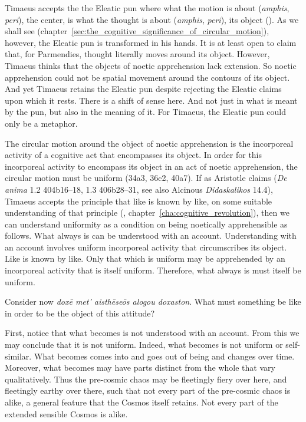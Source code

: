 Timaeus accepts the the Eleatic pun where what the motion is about (\emph{amphis}, \emph{peri}), the center, is what the thought is about (\emph{amphis}, \emph{peri}), its object (\citealt[191--3]{Mourelatos:2008ve}). As we shall see (chapter~\ref{sec:the_cognitive_significance_of_circular_motion}), however, the Eleatic pun is transformed in his hands. It is at least open to claim that, for Parmendies, thought literally moves around its object. However, Timaeus thinks that the objects of noetic apprehension lack extension. So noetic apprehension could not be spatial movement around the contours of its object. And yet Timaeus retains the Eleatic pun despite rejecting the Eleatic claims upon which it rests. There is a shift of sense here. And not just in what is meant by the pun, but also in the meaning of it. For Timaeus, the Eleatic pun could only be a metaphor.

The circular motion around the object of noetic apprehension is the incorporeal activity of a cognitive act that encompasses its object. In order for this incorporeal activity to encompass its object in an act of noetic apprehension, the circular motion must be uniform (34a3, 36c2, 40a7). If as Aristotle claims (\emph{De anima} 1.2 404b16--18, 1.3 406b28--31, see also Alcinous \emph{Didaskalikos} 14.4), Timaeus accepts the principle that like is known by like, on some suitable understanding of that principle (\citealt{Corcilius:2018bd}, chapter~\ref{cha:cognitive_revolution}), then we can understand uniformity as a condition on being noetically apprehensible as follows. What always is can be understood with an account. Understanding with an account involves uniform incorporeal activity that circumscribes its object. Like is known by like. Only that which is uniform may be apprehended by an incorporeal activity that is itself uniform. Therefore, what always is must itself be uniform.

Consider now \emph{doxē met’ aisthēseōs alogou doxaston}. What must something be like in order to be the object of this attitude?

First, notice that what becomes is not understood with an account. From this we may conclude that it is not uniform. Indeed, what becomes is not uniform or self-similar. What becomes comes into and goes out of being and changes over time. Moreover, what becomes may have parts distinct from the whole that vary qualitatively. Thus the pre-cosmic chaos may be fleetingly fiery over here, and fleetingly earthy over there, such that not every part of the pre-cosmic chaos is alike, a general feature that the Cosmos itself retains. Not every part of the extended sensible Cosmos is alike.

